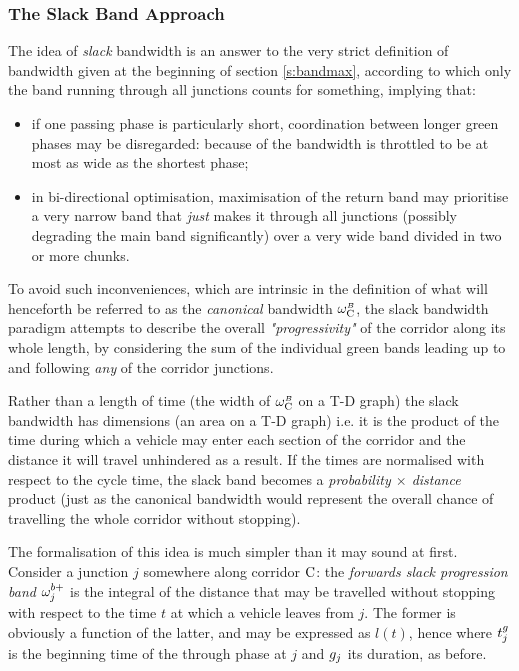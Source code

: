 \subsubsection{The Slack Band Approach} \label{s:slackband}
The idea of \emph{slack} bandwidth is an answer to the very strict definition of bandwidth given at the beginning of section \ref{s:bandmax}, according to which only the band running through all junctions counts for something, implying that:
\begin{itemize}
\item if one passing phase is particularly short, coordination between longer green phases may be disregarded: because of  the bandwidth is throttled to be at most as wide as the shortest phase;
\item in bi-directional optimisation, maximisation of the return band may prioritise a very narrow band that \emph{just} makes it through all junctions (possibly degrading the main band significantly) over a very wide band divided in two or more chunks.
\end{itemize}

To avoid such inconveniences, which are intrinsic in the definition of what will henceforth be referred to as the \emph{canonical} bandwidth $\omega_{\mathrm{C}}^{\scriptscriptstyle{B}}$, the slack bandwidth paradigm attempts to describe the overall \emph{"progressivity"} of the corridor along its whole length, by considering the sum of the individual green bands leading up to and following \emph{any} of the corridor junctions.

Rather than a length of time (the width of $\omega_{\mathrm{C}}^{\scriptscriptstyle{B}}$ on a T-D graph) the slack bandwidth has dimensions  (an area on a T-D graph) i.e. it is the product of the time during which a vehicle may enter each section of the corridor and the distance it will travel unhindered as a result. If the times are normalised with respect to the cycle time, the slack band becomes a \emph{probability $\times$ distance} product (just as the canonical bandwidth would represent the overall chance of travelling the whole corridor without stopping).

The formalisation of this idea is much simpler than it may sound at first. 
Consider a junction $j$ somewhere along corridor $\mathrm{C}$: the \emph{forwards slack progression band} $\omega_{j}^{\scriptstyle{b+}}$ is the integral of the distance that may be travelled without stopping with respect to the time $t$ at which a vehicle leaves from $j$. The former is obviously a function of the latter, and may be expressed as $l(t)$, hence
where $t_{j}^{\scriptstyle{g}}$ is the beginning time of the through phase at $j$ and $g_{j}$ its duration, as before.

